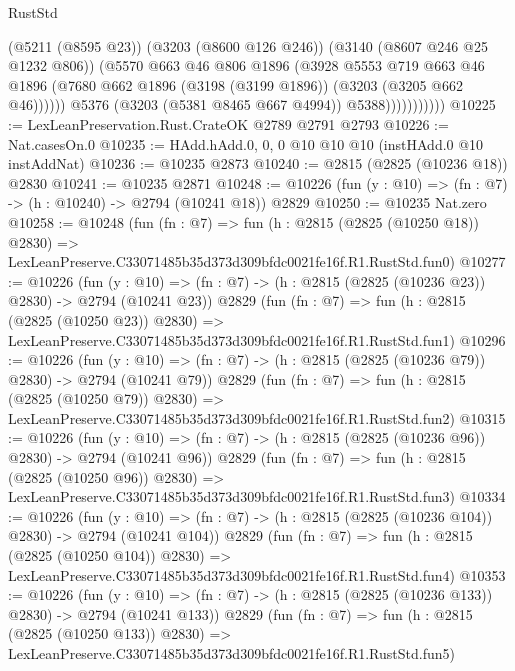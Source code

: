 \begin{lexlean}{RustStd}
\begin{coremodule}
                            (@5211 (@8595 @23))
                            (@3203 (@8600 @126 @246))
                            (@3140 (@8607 @246 @25 @1232 @806))
                            (@5570
                              @663
                              @46
                              @806
                              @1896
                              (@3928
                                @5553
                                @719
                                @663
                                @46
                                @1896
                                (@7680 @662 @1896 (@3198 (@3199 @1896)) (@3203 (@3205 @662 @46))))))
                          @5376
                          (@3203 (@5381 @8465 @667 @4994))
                          @5388)))))))))))
@10225 := LexLeanPreservation.Rust.CrateOK @2789 @2791 @2793
@10226 := Nat.casesOn.{0}
@10235 := HAdd.hAdd.{0, 0, 0} @10 @10 @10 (instHAdd.{0} @10 instAddNat)
@10236 := @10235 @2873
@10240 := @2815 (@2825 (@10236 @18)) @2830
@10241 := @10235 @2871
@10248 := @10226 (fun (y : @10) => (fn : @7) -> (h : @10240) -> @2794 (@10241 @18)) @2829
@10250 := @10235 Nat.zero
@10258 := @10248
    (fun (fn : @7) =>
    fun (h : @2815 (@2825 (@10250 @18)) @2830) =>
    LexLeanPreserve.C33071485b35d373d309bfdc0021fe16f.R1.RustStd.fun0)
@10277 := @10226
    (fun (y : @10) => (fn : @7) -> (h : @2815 (@2825 (@10236 @23)) @2830) -> @2794 (@10241 @23))
    @2829
    (fun (fn : @7) =>
    fun (h : @2815 (@2825 (@10250 @23)) @2830) =>
    LexLeanPreserve.C33071485b35d373d309bfdc0021fe16f.R1.RustStd.fun1)
@10296 := @10226
    (fun (y : @10) => (fn : @7) -> (h : @2815 (@2825 (@10236 @79)) @2830) -> @2794 (@10241 @79))
    @2829
    (fun (fn : @7) =>
    fun (h : @2815 (@2825 (@10250 @79)) @2830) =>
    LexLeanPreserve.C33071485b35d373d309bfdc0021fe16f.R1.RustStd.fun2)
@10315 := @10226
    (fun (y : @10) => (fn : @7) -> (h : @2815 (@2825 (@10236 @96)) @2830) -> @2794 (@10241 @96))
    @2829
    (fun (fn : @7) =>
    fun (h : @2815 (@2825 (@10250 @96)) @2830) =>
    LexLeanPreserve.C33071485b35d373d309bfdc0021fe16f.R1.RustStd.fun3)
@10334 := @10226
    (fun (y : @10) => (fn : @7) -> (h : @2815 (@2825 (@10236 @104)) @2830) -> @2794 (@10241 @104))
    @2829
    (fun (fn : @7) =>
    fun (h : @2815 (@2825 (@10250 @104)) @2830) =>
    LexLeanPreserve.C33071485b35d373d309bfdc0021fe16f.R1.RustStd.fun4)
@10353 := @10226
    (fun (y : @10) => (fn : @7) -> (h : @2815 (@2825 (@10236 @133)) @2830) -> @2794 (@10241 @133))
    @2829
    (fun (fn : @7) =>
    fun (h : @2815 (@2825 (@10250 @133)) @2830) =>
    LexLeanPreserve.C33071485b35d373d309bfdc0021fe16f.R1.RustStd.fun5)

\end{coremodule}
\end{lexlean}
